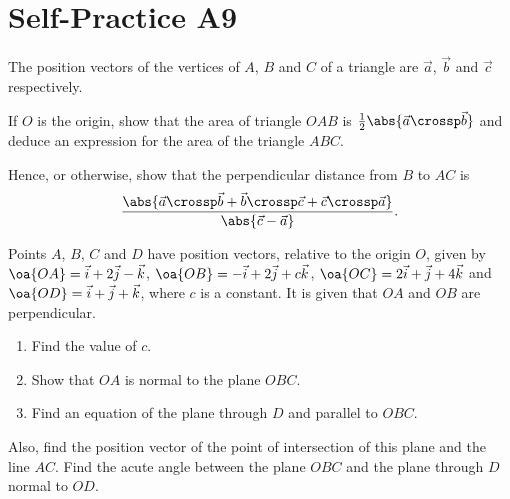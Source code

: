\section{Self-Practice A9}

\begin{problem}
    The position vectors of the vertices of $A$, $B$ and $C$ of a triangle are $\vec a$, $\vec b$ and $\vec c$ respectively.

    If $O$ is the origin, show that the area of triangle $OAB$ is $\frac12 \abs{\vec a \crossp \vec b}$ and deduce an expression for the area of the triangle $ABC$.

    Hence, or otherwise, show that the perpendicular distance from $B$ to $AC$ is \[\frac{\abs{\vec a \crossp \vec b + \vec b \crossp \vec c + \vec c \crossp \vec a}}{\abs{\vec c - \vec a}}.\]
\end{problem}

\begin{problem}
    Points $A$, $B$, $C$ and $D$ have position vectors, relative to the origin $O$, given by $\oa{OA} = \vec i + 2\vec j - \vec k$, $\oa{OB} = -\vec i + 2\vec j + c\vec k$, $\oa{OC} = 2\vec i + \vec j + 4 \vec k$ and $\oa{OD} = \vec i + \vec j + \vec k$, where $c$ is a constant. It is given that $OA$ and $OB$ are perpendicular.

    \begin{enumerate}
        \item Find the value of $c$.
        \item Show that $OA$ is normal to the plane $OBC$.
        \item Find an equation of the plane through $D$ and parallel to $OBC$.
    \end{enumerate}

    Also, find the position vector of the point of intersection of this plane and the line $AC$. Find the acute angle between the plane $OBC$ and the plane through $D$ normal to $OD$.
\end{problem}


